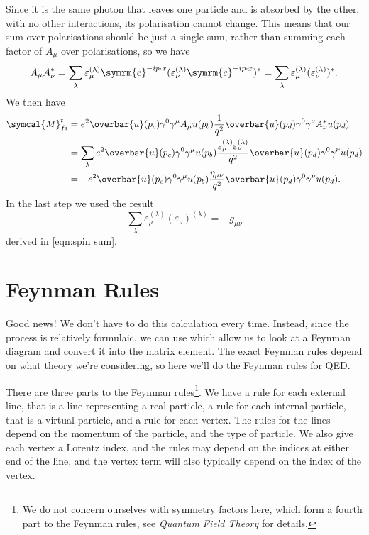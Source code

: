 \documentclass[fleqn]{NotesClass}
\newcommand{\course}[1]{\textit{#1}}
\newcommand{\e}{\symrm{e}}
\newcommand{\amplitude}{\symcal{M}}
\newcommand{\diracadjoint}[1]{\overbar{#1}}
\newcommand{\minkowskiMetric}{\eta}
\begin{document}
    Since it is the same photon that leaves one particle and is absorbed by the other, with no other interactions, its polarisation cannot change.
    This means that our sum over polarisations should be just a single sum, rather than summing each factor of \(A_\mu\) over polarisations, so we have
    \begin{equation}
        A_\mu A_\nu^* = \sum_{\lambda} \varepsilon_\mu^{(\lambda)}\e^{-ip\cdot x}(\varepsilon_\nu^{(\lambda)} \e^{-ip\cdot x})^* = \sum_{\lambda} \varepsilon_\mu^{(\lambda)} (\varepsilon_\nu^{(\lambda)})^*.
    \end{equation}
    We then have
    \begin{align}
        \amplitude_{fi}^t &= e^2 \diracadjoint{u}(p_c) \gamma^0\gamma^\mu A_\mu u(p_b) \frac{1}{q^2} \diracadjoint{u}(p_d) \gamma^0\gamma^\nu A_\nu^* u(p_d)\\
        &= \sum_\lambda e^2 \diracadjoint{u}(p_c) \gamma^0 \gamma^\mu u(p_b) \frac{\varepsilon_\mu^{(\lambda)} \varepsilon_\nu^{(\lambda)}}{q^2} \diracadjoint{u}(p_d) \gamma^0\gamma^\nu u(p_d)\\
        &= -e^2 \diracadjoint{u}(p_c) \gamma^0 \gamma^\mu u(p_b) \frac{\minkowskiMetric_{\mu\nu}}{q^2} \diracadjoint{u}(p_d) \gamma^0\gamma^\nu u(p_d).\label{eqn:electron tau scattering amplitude}
    \end{align}
    In the last step we used the result
    \begin{equation}
        \sum_\lambda \varepsilon_\mu^{(\lambda)}(\varepsilon_\nu)^{(\lambda)} = -g_{\mu\nu}
    \end{equation}
    derived in \cref{eqn:spin sum}.
    
    \section{Feynman Rules}\label{sec:feynman rules QED}
    Good news!
    We don't have to do this calculation every time.
    Instead, since the process is relatively formulaic, we can use  which allow us to look at a Feynman diagram and convert it into the matrix element.
    The exact Feynman rules depend on what theory we're considering, so here we'll do the Feynman rules for QED.
    
    There are three parts to the Feynman rules\footnote{We do not concern ourselves with symmetry factors here, which form a fourth part to the Feynman rules, see \course{Quantum Field Theory} for details.}.
    We have a rule for each external line, that is a line representing a real particle, a rule for each internal particle, that is a virtual particle, and a rule for each vertex.
    The rules for the lines depend on the momentum of the particle, and the type of particle.
    We also give each vertex a Lorentz index, and the rules may depend on the indices at either end of the line, and the vertex term will also typically depend on the index of the vertex.
    
\end{document}
